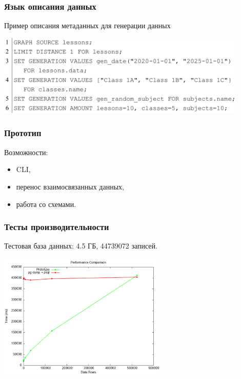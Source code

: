 \documentclass[pdf, hyperref={unicode}, aspectratio=169]{beamer}
\begin{document}
\begin{frame}
\frametitle{Язык описания данных}
	Пример описания метаданных для генерации данных

	\begin{center}
		\includegraphics[width = 12cm]{img/language-3}
	\end{center}
\end{frame}


\begin{frame}
\frametitle{Прототип}
	Возможности:

	\begin{itemize}
		\item CLI,
		\item перенос взаимосвязанных данных,
		\item работа со схемами.
	\end{itemize}
\end{frame}


\begin{frame}
\frametitle{Тесты производительности}
	Тестовая база данных: 4.5 ГБ, 44739072 записей.

	\begin{center}
		\includegraphics[height = 6cm]{img/benchmark}
	\end{center}
\end{frame}
\end{document}
